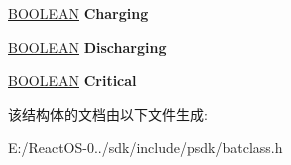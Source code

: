 \begin{DoxyCompactItemize}
\hyperlink{_processor_bind_8h_a112e3146cb38b6ee95e64d85842e380a}{B\+O\+O\+L\+E\+AN} {\bfseries Charging}
\item 
\mbox{\label{struct___b_a_t_t_e_r_y___w_m_i___s_t_a_t_u_s_a2e7989fa30a99ca9bc2cfdc3f065aba5}} 
\hyperlink{_processor_bind_8h_a112e3146cb38b6ee95e64d85842e380a}{B\+O\+O\+L\+E\+AN} {\bfseries Discharging}
\item 
\mbox{\label{struct___b_a_t_t_e_r_y___w_m_i___s_t_a_t_u_s_a673f2eefea1907506785a45beb83a272}} 
\hyperlink{_processor_bind_8h_a112e3146cb38b6ee95e64d85842e380a}{B\+O\+O\+L\+E\+AN} {\bfseries Critical}
\end{DoxyCompactItemize}


该结构体的文档由以下文件生成\+:\begin{DoxyCompactItemize}
\item 
E\+:/\+React\+O\+S-\/0../sdk/include/psdk/batclass.\+h\end{DoxyCompactItemize}

